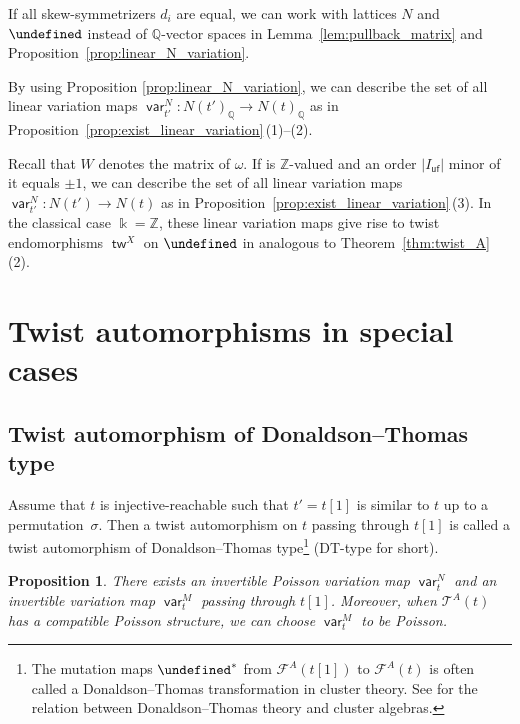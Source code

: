 \documentclass[10pt,a4paper]{amsart}
\newcommand{\kk}{\Bbbk}
\newcommand{\Z}{\mathbb{Z}}
\newcommand{\Q}{\mathbb{Q}}
\renewcommand{\tilde}[1]{\widetilde{#1}}
\newcommand{\opname}[1]{\operatorname{\mathsf{#1}}}
\newcommand{\cF}{{\mathcal F}}
\newcommand{\cT}{{\mathcal T}}
\newcommand{\tw}{{\tilde{w}}}
\newcommand{\var}{\opname{var}}
\newcommand{\fv}{\opname{f}}
\newcommand{\ufv}{\opname{uf}}
\let\Mc\undefined
\let\XClAlg\undefined
\let\seq\undefined
\let\low\undefined
\renewcommand{\tw}{\opname{tw}}
\newcommand{\Mc}{M^\circ}
\newcommand{\XClAlg}{\mathcal{U}^X}
\newcommand{\seq}{\boldsymbol{\mu}}%
\renewcommand{\tw}{\opname{tw}}
\newcommand{\low}{\opname{\fv,\ufv}}
\numberwithin{equation}{section}
\newtheorem{Proposition}[Theorem]{Proposition}
 { \theoremstyle{definition}
\newtheorem{Definition}[Theorem]{Definition}
\newtheorem{Note}[Theorem]{Note}
\newtheorem{Example}[Theorem]{Example}
\newtheorem{Remark}[Theorem]{Remark}
\newtheorem{Assumption}[Theorem]{Assumption}
}
\begin{document}
\begin{Remark}[{existence of $\tw^X$}]\label{rem:exist_X_twist}
If all skew-symmetrizers $d_{i}$ are equal, we can work with lattices
$N$ and $\Mc$ instead of $\Q$-vector spaces in Lemma~\ref{lem:pullback_matrix}
and Proposition~\ref{prop:linear_N_variation}.

By using Proposition \ref{prop:linear_N_variation}, we can describe
the set of all linear variation maps $\var_{t'}^{N}\colon N(t')_{\Q}\rightarrow N(t)_{\Q}$
as in Proposition~\ref{prop:exist_linear_variation}\,(1)--(2).

Recall that $W$ denotes the matrix of $\omega$. If \smash{$\left(\begin{smallmatrix}
W_{\ufv}\\
W_{\low}
\end{smallmatrix}\right)$} is $\Z$-valued and an order $|I_{\ufv}|$ minor of it equals $\pm1$,
we can describe the set of all linear variation maps $\var_{t'}^{N}\colon N(t')\rightarrow N(t)$
as in Proposition~\ref{prop:exist_linear_variation}\,(3). In the classical case $\kk=\Z$, these linear variation
maps give rise to twist endomorphisms $\tw^{X}$ on $\XClAlg$ in
analogous to Theorem~\ref{thm:twist_A}\,(2).
\end{Remark}

\section{Twist automorphisms in special cases}\label{sec:Twist-automorphisms-special-cases}

\subsection{Twist automorphism of Donaldson--Thomas type}\label{subsec:Cluster-twist-automorphism-DT}

Assume that $t$ is injective-reachable such that $t'=t[1]$ is similar
to $t$ up to a permutation~$\sigma$. Then a twist automorphism on
$t$ passing through $t[1]$ is called a twist automorphism of Donaldson--Thomas
type\footnote{The mutation maps $\seq^{*}$ from $\cF^{A}(t[1])$ to $\cF^{A}(t)$
is often called a Donaldson--Thomas transformation in cluster theory.
See \cite{Nagao10} for the relation between Donaldson--Thomas theory
and cluster algebras.} (DT-type for short).

\begin{Proposition}\label{prop:exist_var_DT}
 There exists an invertible Poisson variation map $\var_{t}^{N}$ and an invertible variation map $\var_{t}^{M}$
passing through $t[1]$. Moreover, when $\cT^A(t)$ has a compatible Poisson structure, we can choose $\var_{t}^{M}$ to be Poisson.
\end{Proposition}
\end{document}
